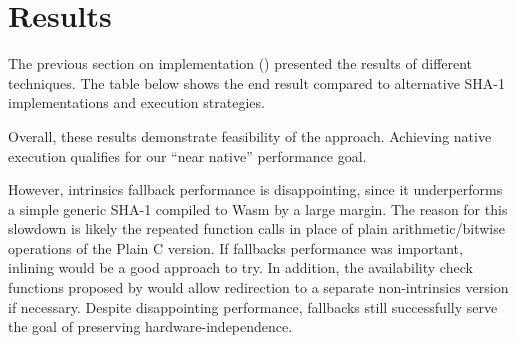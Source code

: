 \section{Results}
\label{sec:results}

The previous section on implementation () presented the
results of different techniques. The table below shows the end result compared
to alternative SHA-1 implementations and execution strategies.

\begin{center}

\end{center}

Overall, these results demonstrate feasibility of the approach. Achieving
\MetricInlineWasmtimeHwwasmDivNative native execution qualifies for our ``near
native'' performance goal.

However, intrinsics fallback performance is disappointing, since it underperforms a
simple generic SHA-1 compiled to Wasm by a large margin.
%
The reason for this slowdown is likely the repeated \wasm function calls in
place of plain arithmetic/bitwise operations of the Plain C version. If
fallbacks performance was important, inlining would be a good approach to try.
%
In addition, the availability check functions proposed by
 would allow redirection to a separate non-intrinsics
version if necessary.
%
Despite disappointing performance, fallbacks still successfully serve the goal
of preserving \wasm hardware-independence.
